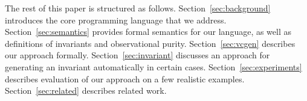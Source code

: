 
The rest of this paper is structured as
follows. Section~\ref{sec:background} introduces the core programming
language that we address. Section~\ref{sec:semantics} provides formal
semantics for our language, as well as definitions of invariants and
observational purity. Section~\ref{sec:vcgen} describes our approach
formally. Section~\ref{sec:invariant} discusses an approach for generating
an invariant automatically in certain cases. Section~\ref{sec:experiments}  describes evaluation of our approach on a few realistic examples.
Section~\ref{sec:related} describes related work.

